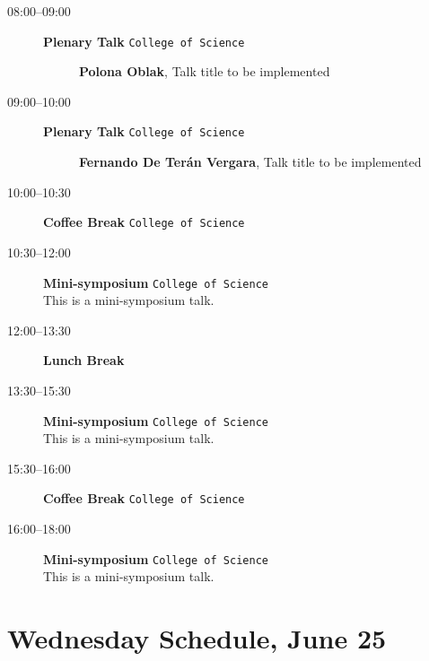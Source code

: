 \documentclass[ILAS2025-program.tex]{subfiles}
\begin{document}
    \begin{description}
    \item[08:00--09:00] \textbf{Plenary Talk} {\footnotesize\texttt{College of Science}}
    \begin{description}
        \item[] \textbf{Polona Oblak}, Talk title to be implemented
        \end{description}
        \item[09:00--10:00] \textbf{Plenary Talk} {\footnotesize\texttt{College of Science}}
    \begin{description}
        \item[] \textbf{Fernando De Terán Vergara}, Talk title to be implemented
        \end{description}
        \item[10:00--10:30] \textbf{Coffee Break} {\footnotesize\texttt{College of Science}}
    \item[10:30--12:00] \textbf{Mini-symposium} {\footnotesize\texttt{College of Science}}
    \\This is a mini-symposium talk.\item[12:00--13:30] \textbf{Lunch Break} {\footnotesize\texttt{}}
    \item[13:30--15:30] \textbf{Mini-symposium} {\footnotesize\texttt{College of Science}}
    \\This is a mini-symposium talk.\item[15:30--16:00] \textbf{Coffee Break} {\footnotesize\texttt{College of Science}}
    \item[16:00--18:00] \textbf{Mini-symposium} {\footnotesize\texttt{College of Science}}
    \\This is a mini-symposium talk.\end{description}
    \newpage

\section{Wednesday Schedule, June 25}
    
\end{document}

